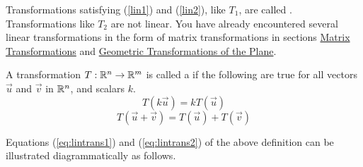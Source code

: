 \documentclass{ximera}
\begin{document}
Transformations satisfying (\ref{lin1}) and (\ref{lin2}), like $T_1$, are called . Transformations like $T_2$ are not linear.
 You have already encountered several linear transformations in the form of matrix transformations in sections \href{https://ximera.osu.edu/oerlinalg/LinearAlgebra/LTR-0005/main}{Matrix Transformations} and \href{https://ximera.osu.edu/oerlinalg/LinearAlgebra/LTR-0070/main}{Geometric Transformations of the Plane}.  

  \begin{definition} \label{def:lin}
 A transformation $T:\mathbb{R}^n\rightarrow \mathbb{R}^m$ is called a  if the following are true for all vectors $\vec{u}$ and $\vec{v}$ in $\mathbb{R}^n$, and scalars $k$.
\begin{equation}\label{eq:lintrans1}
T(k\vec{u})= kT(\vec{u})
\end{equation}
\begin{equation}\label{eq:lintrans2}
T(\vec{u}+\vec{v})= T(\vec{u})+T(\vec{v})
\end{equation}
\end{definition}

Equations (\ref{eq:lintrans1}) and (\ref{eq:lintrans2}) of the above definition can be illustrated diagrammatically as follows.

\begin{center}
\end{center}
\end{document}

